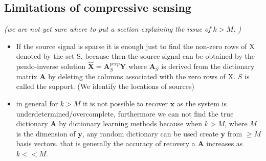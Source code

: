 

\subsection{Limitations of compressive sensing}
\textit{(we are not yet sure where to put a section explaining the issue of $k>M$. )}
\begin{itemize}
\item If the source signal is sparse it is enough just to find the non-zero rows of X denoted by the set S, because then the source signal can be obtained by the psudo-inverse solution $\hat{\mathbf{X}} = \mathbf{A}_S^{perp} \mathbf{Y}$ where $\mathbf{A}_S$ is derived from the dictionary matrix $\mathbf{A}$ by deleting the columns associated with the zero rows of X. $S$ is called the support. (We identify the locations of sources)
\item in general for $k>M$ it is not possible to recover $\textbf{x}$ as the system is underdetermined/overcomplete, furthermore we can not find the true dictionary $\textbf{A}$ by dictionary learning methods because when $k>M$, where $M$ is the dimension of $\textbf{y}$, any random dictionary can be used create $\textbf{y}$ from $\geq M$ basis vectors. that is generally the accuracy of recovery a $\textbf{A}$ increases as $k<<M$.\\
\end{itemize}



